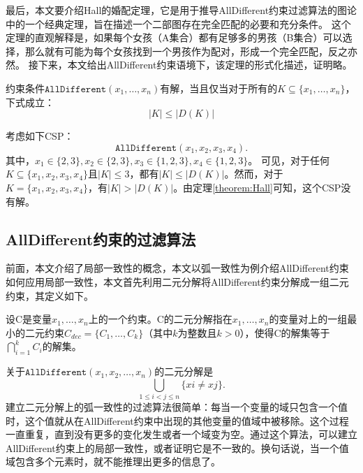 最后，本文要介绍Hall的婚配定理\cite{hall1987representatives}，它是用于推导AllDifferent约束过滤算法的图论中的一个经典定理，旨在描述一个二部图存在完全匹配的必要和充分条件。
这个定理的直观解释是，如果每个女孩（A集合）都有足够多的男孩（B集合）可以选择，那么就有可能为每个女孩找到一个男孩作为配对，形成一个完全匹配，反之亦然。
接下来，本文给出AllDifferent约束语境下，该定理的形式化描述，证明略。

\begin{theorem}\label{theorem:Hall}
    约束条件$\texttt {AllDifferent}(x_1, \dots, x_n)$有解，当且仅当对于所有的$K \subseteq \{x_1, \dots, x_n\}$，下式成立：
    \begin{equation*}
        |K| \leq |D(K)|
    \end{equation*}
    
\end{theorem}

\begin{example}
    考虑如下CSP：
    \begin{equation*}
        \texttt {AllDifferent}(x_1, x_2, x_3, x_4).
    \end{equation*}
    其中，$x_1 \in \{2, 3\}, x_2 \in \{2, 3\}, x_3 \in \{1, 2, 3\}, x_4 \in \{1, 2, 3\}$。
    可见，对于任何$K \subseteq \{x_1, x_2, x_3, x_4\}$且$|K| \leq 3$，都有$|K| \leq |D(K)|$。然而，对于$K = \{x_1, x_2, x_3, x_4\}$，有$|K| > |D(K)|$。由定理\ref{theorem:Hall}可知，这个CSP没有解。
\end{example}

\subsection{AllDifferent约束的过滤算法}

前面，本文介绍了局部一致性的概念，本文以弧一致性为例介绍AllDifferent约束如何应用局部一致性，本文首先利用二元分解将AllDifferent约束分解成一组二元约束，其定义如下。

\begin{definition}[二元分解]
设C是变量$x_1, \dots, x_n$上的一个约束。C的二元分解指在$x_1, \dots, x_n$的变量对上的一组最小的二元约束$C_{dec} = \{C_1, \dots, C_k\}$（其中$k$为整数且$k > 0$），使得C的解集等于$\bigcap_{i=1}^{k} C_i$的解集。
\end{definition}

关于$\texttt {AllDifferent}(x_1, x_2, \dots, x_n)$的二元分解是
\begin{equation}
    \bigcup_{1 \leq i < j \leq n} \{xi \neq xj\}.
\end{equation}
建立二元分解上的弧一致性的过滤算法很简单：每当一个变量的域只包含一个值时，这个值就从在AllDifferent约束中出现的其他变量的值域中被移除。这个过程一直重复，直到没有更多的变化发生或者一个域变为空。通过这个算法，可以建立AllDifferent约束上的局部一致性，或者证明它是不一致的。换句话说，当一个值域包含多个元素时，就不能推理出更多的信息了。

